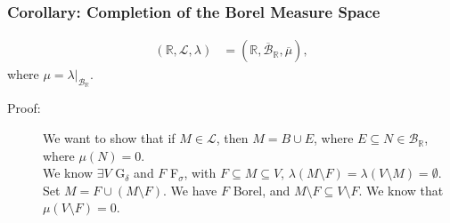 \documentclass[9pt]{extarticle}
\newcommand{\R}{\mathbb{R}}
\begin{document}
  \subsubsection{Corollary: Completion of the Borel Measure Space}%
  \begin{align*}
    (\R,\mathcal{L},\lambda) &= \left(\R,\overline{\mathcal{B}}_{\R},\overline{\mu}\right),
  \end{align*}
  where $\mu = \lambda|_{\mathcal{B}_{\R}}$.
  \begin{description}
    \item[Proof:] We want to show that if $M\in \mathcal{L}$, then $M = B \cup E$, where $E\subseteq N\in \mathcal{B}_{\R}$, where $\mu(N) = 0$.\\

      We know $\exists V$ G$_{\delta}$ and $F$ F$_{\sigma}$, with $F\subseteq M\subseteq V$, $\lambda(M\setminus F) = \lambda(V\setminus M) = \emptyset$.\\

      Set $M = F \cup (M\setminus F)$. We have $F$ Borel, and $M\setminus F \subseteq V\setminus F$. We know that $\mu(V\setminus F) = 0$.
  \end{description}
\end{document}
